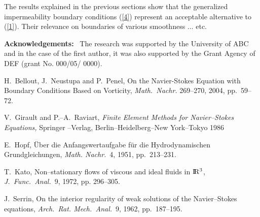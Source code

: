 \documentclass[twocolumn,11pt]{article}
\newcommand{\R}{{\rm I}\!{\rm R}} %
\begin{document}
The results explained in the previous sections show that the
generalized impermeability boundary conditions (\ref{4}) represent
an acceptable alternative to (\ref{1}). Their relevance on
boundaries of various smoothness $\dots$ etc.


\vspace{10pt} \noindent
{\bf Acknowledgements:} \ The research was supported by the
University of ABC and in the case of the first author, it was also
supported by the Grant Agency of DEF (grant No. 000/05/ 0000).

\begin{thebibliography}{11}

\vspace{-7pt}
H.~Bellout, J.~Neustupa and P.~Penel, On the Navier-Stokes
Equation with Boundary Condi\-tions Based on Vorticity, {\em
Math.~Nachr.} 269--270, 2004, pp.~59--72.

\vspace{-7pt}
V.~Girault and P.--A.~Raviart, {\em Finite Element Methods for
Navier--Stokes Equations,} Springer --Verlag,
Berlin--Heidelberg--New York--Tokyo 1986

\vspace{-7pt}
E.~Hopf, \"Uber die Anfangswertaufgabe f\"ur die Hydrodynamischen
Grundgleichungen, {\em Math. Nachr.}~4, 1951, pp.~213--231.

\vspace{-7pt}
T.~Kato, Non--stationary flows of viscous and ideal fluids in
$\R^3$, {\em J.~Func.~Anal.}~9, 1972, pp. 296--305.

\vspace{-7pt}
J.~Serrin, On the interior regularity of weak solutions of the
Navier--Stokes equations, {\em Arch.~Rat. Mech.~Anal.}~9, 1962,
pp.~187--195.

\end{thebibliography}
\end{document}
